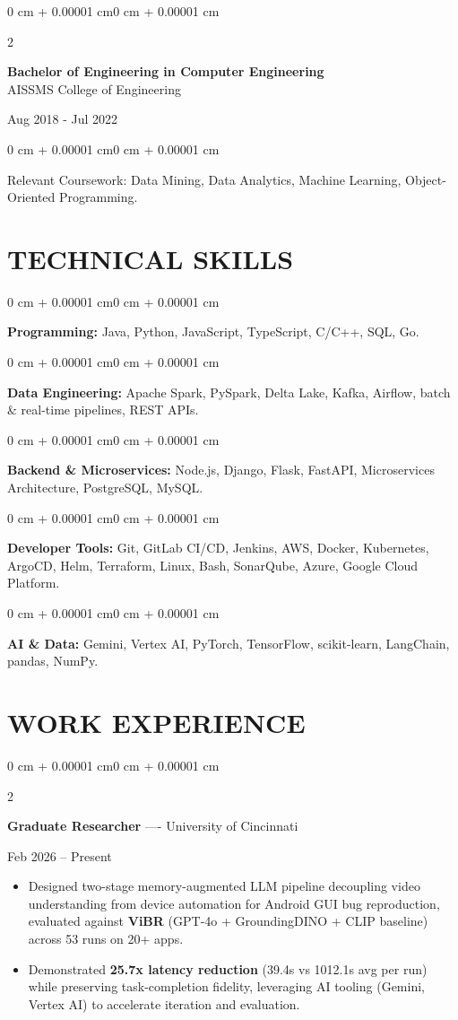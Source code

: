 \documentclass[10pt, letterpaper]{article}
\newenvironment{highlights}{
    \begin{itemize}[
        topsep=0.10 cm,
        parsep=0.06 cm,
        partopsep=0pt,
        itemsep=0.06 cm,
        leftmargin=12pt
    ]
}{
    \end{itemize}
}
\newenvironment{onecolentry}{
    \begin{adjustwidth}{0 cm + 0.00001 cm}{0 cm + 0.00001 cm}
}{
    \end{adjustwidth}
}
\newenvironment{twocolentry}[2][]{
    \onecolentry
    \def\secondColumn{#2}
    \setcolumnwidth{\fill, 4.5 cm}
    \begin{paracol}{2}
}{
    \switchcolumn \raggedleft \secondColumn
    \end{paracol}
    \endonecolentry
}
\begin{document}
\begin{twocolentry}{
    Aug 2018 - Jul 2022
}
    \textbf{Bachelor of Engineering in Computer Engineering} \\
    AISSMS College of Engineering
\end{twocolentry}
\begin{onecolentry}
Relevant Coursework: Data Mining, Data Analytics, Machine Learning, Object-Oriented Programming.
\end{onecolentry}
\section{TECHNICAL SKILLS}
\begin{onecolentry}
\textbf{Programming:} Java, Python, JavaScript, TypeScript, C/C++, SQL, Go.
\end{onecolentry}
\vspace{0.06 cm}
\begin{onecolentry}
\textbf{Data Engineering:} Apache Spark, PySpark, Delta Lake, Kafka, Airflow, batch \& real-time pipelines, REST APIs.
\end{onecolentry}
\vspace{0.06 cm}
\begin{onecolentry}
\textbf{Backend \& Microservices:} Node.js, Django, Flask, FastAPI, Microservices Architecture, PostgreSQL, MySQL.
\end{onecolentry}
\vspace{0.06 cm}
\begin{onecolentry}
\textbf{Developer Tools:} Git, GitLab CI/CD, Jenkins, AWS, Docker, Kubernetes, ArgoCD, Helm, Terraform, Linux, Bash, SonarQube, Azure, Google Cloud Platform.
\end{onecolentry}
\vspace{0.06 cm}
\begin{onecolentry}
\textbf{AI \& Data:} Gemini, Vertex AI, PyTorch, TensorFlow, scikit-learn, LangChain, pandas, NumPy.
\end{onecolentry}

\section{WORK EXPERIENCE}
\begin{twocolentry}{Feb 2026 -- Present}
\textbf{Graduate Researcher} ---- University of Cincinnati
\end{twocolentry}
\begin{highlights}
  \item Designed two-stage memory-augmented LLM pipeline decoupling video understanding from device automation for Android GUI bug reproduction, evaluated against \textbf{ViBR} (GPT-4o + GroundingDINO + CLIP baseline) across 53 runs on 20+ apps.
  \item Demonstrated \textbf{25.7x latency reduction} (39.4s vs 1012.1s avg per run) while preserving task-completion fidelity, leveraging AI tooling (Gemini, Vertex AI) to accelerate iteration and evaluation.
\end{highlights}
\end{document}
